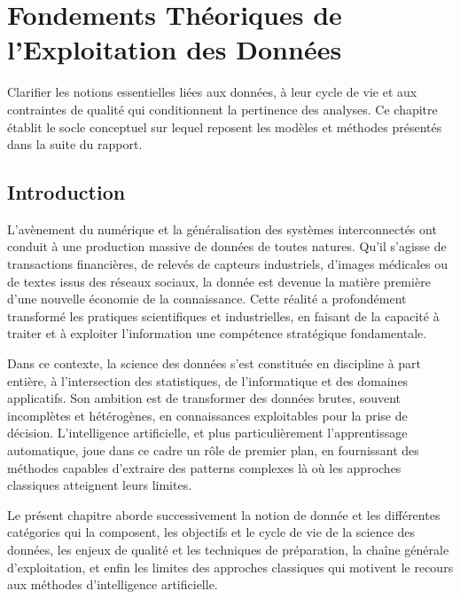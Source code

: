 \chapter{Fondements Théoriques de l'Exploitation des Données}

\begin{objectifbox}
Clarifier les notions essentielles liées aux données, à leur cycle de vie et aux contraintes de qualité qui conditionnent la pertinence des analyses. Ce chapitre établit le socle conceptuel sur lequel reposent les modèles et méthodes présentés dans la suite du rapport.
\end{objectifbox}

\section{Introduction}

L'avènement du numérique et la généralisation des systèmes interconnectés ont conduit à une production massive de données de toutes natures. Qu'il s'agisse de transactions financières, de relevés de capteurs industriels, d'images médicales ou de textes issus des réseaux sociaux, la donnée est devenue la matière première d'une nouvelle économie de la connaissance. Cette réalité a profondément transformé les pratiques scientifiques et industrielles, en faisant de la capacité à traiter et à exploiter l'information une compétence stratégique fondamentale.

Dans ce contexte, la science des données s'est constituée en discipline à part entière, à l'intersection des statistiques, de l'informatique et des domaines applicatifs. Son ambition est de transformer des données brutes, souvent incomplètes et hétérogènes, en connaissances exploitables pour la prise de décision. L'intelligence artificielle, et plus particulièrement l'apprentissage automatique, joue dans ce cadre un rôle de premier plan, en fournissant des méthodes capables d'extraire des patterns complexes là où les approches classiques atteignent leurs limites.

Le présent chapitre aborde successivement la notion de donnée et les différentes catégories qui la composent, les objectifs et le cycle de vie de la science des données, les enjeux de qualité et les techniques de préparation, la chaîne générale d'exploitation, et enfin les limites des approches classiques qui motivent le recours aux méthodes d'intelligence artificielle.

